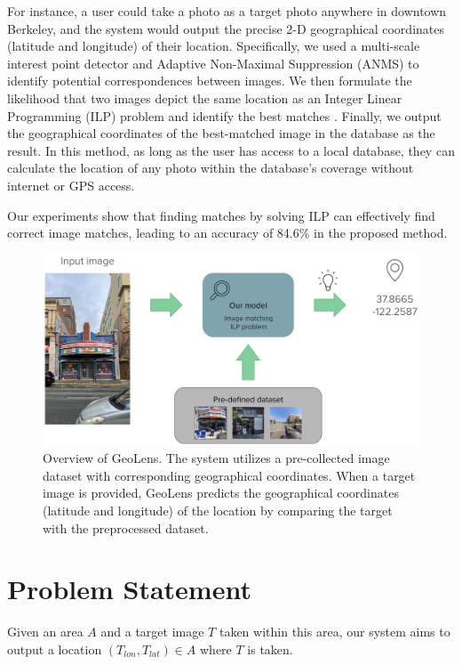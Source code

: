 \documentclass[10pt,twocolumn,letterpaper]{article}
\begin{document}
For instance, a user could take a photo as a target photo anywhere in downtown Berkeley, and the system would output the precise 2-D geographical coordinates (latitude and longitude) of their location. Specifically, we used a multi-scale interest point detector and Adaptive Non-Maximal Suppression (ANMS) \cite{1467310} to identify potential correspondences between images. We then formulate the likelihood that two images depict the same location as an Integer Linear Programming (ILP) problem and identify the best matches \cite{torresani2008feature}. Finally, we output the geographical coordinates of the best-matched image in the database as the result. In this method, as long as the user has access to a local database, they can calculate the location of any photo within the database's coverage without internet or GPS access.

Our experiments show that finding matches by solving ILP can effectively find correct image matches, leading to an accuracy of 84.6\% in the proposed method.

\begin{figure}[!t]
    \centering
    \includegraphics[width=\linewidth]{fig/overview.png}
    \caption{Overview of GeoLens.  The system utilizes a pre-collected image dataset with corresponding geographical coordinates. When a target image is provided, GeoLens predicts the geographical coordinates (latitude and longitude) of the location by comparing the target with the preprocessed dataset. }
    \label{matching}
\end{figure}


\section{Problem Statement}

Given an area $A$ and a target image $T$ taken within this area, our system aims to output a location $(T_{lon}, T_{lat}) \in A$ where $T$ is taken. 
\end{document}
